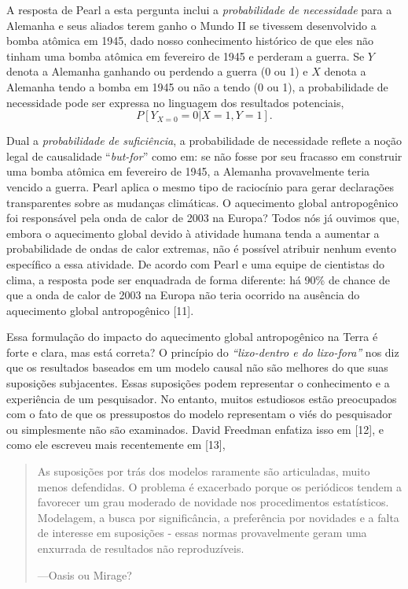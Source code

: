     A resposta de Pearl a esta pergunta inclui a \textit{probabilidade de necessidade} para a Alemanha e seus aliados terem ganho o Mundo II se tivessem desenvolvido a bomba atômica em 1945, dado nosso conhecimento histórico de que eles não tinham uma bomba atômica em fevereiro de 1945 e perderam a guerra. Se \(Y\) denota a Alemanha ganhando ou perdendo a guerra (0 ou 1) e \(X\) denota a Alemanha tendo a bomba em 1945 ou não a tendo (0 ou 1), a probabilidade de necessidade pode ser expressa no linguagem dos resultados potenciais,
     \[P[Y_{X=0} = 0|X = 1, Y = 1].\]
    
    Dual a \textit{probabilidade de suficiência}, a probabilidade de necessidade reflete a noção legal de causalidade ``\textit{but-for}'' como em: se não fosse por seu fracasso em construir uma bomba atômica em fevereiro de 1945, a Alemanha provavelmente teria vencido a guerra. Pearl aplica o mesmo tipo de raciocínio para gerar declarações transparentes sobre as mudanças climáticas. O aquecimento global antropogênico foi responsável pela onda de calor de 2003 na Europa? Todos nós já ouvimos que, embora o aquecimento global devido à atividade humana tenda a aumentar a probabilidade de ondas de calor extremas, não é possível atribuir nenhum evento específico a essa atividade. De acordo com Pearl e uma equipe de cientistas do clima, a resposta pode ser enquadrada de forma diferente: há 90\% de chance de que a onda de calor de 2003 na Europa não teria ocorrido na ausência do aquecimento global antropogênico [11].

    Essa formulação do impacto do aquecimento global antropogênico na Terra é forte e clara, mas está correta? O princípio do \textit{``lixo-dentro e do lixo-fora''} nos diz que os resultados baseados em um modelo causal não são melhores do que suas suposições subjacentes. Essas suposições podem representar o conhecimento e a experiência de um pesquisador. No entanto, muitos estudiosos estão preocupados com o fato de que os pressupostos do modelo representam o viés do pesquisador ou simplesmente não são examinados. David Freedman enfatiza isso em [12], e como ele escreveu mais recentemente em [13],

\begin{quotation}
        As suposições por trás dos modelos raramente são articuladas, muito menos defendidas. O problema é exacerbado porque os periódicos tendem a favorecer um grau moderado de novidade nos procedimentos estatísticos. Modelagem, a busca por significância, a preferência por novidades e a falta de interesse em suposições - essas normas provavelmente geram uma enxurrada de resultados não reproduzíveis.
        
        —Oasis ou Mirage?
\end{quotation}

